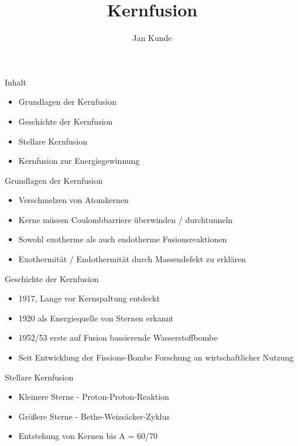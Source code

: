 \documentclass[aspectratio=169,xcolor=dvipsnames,14pt]{beamer}
\title{Kernfusion}
\author{\color{LightGrey}Jan Kunde}
\date{}
\begin{document}
\color{LightGrey}
\begin{frame}{}
\color{LightGrey}
\maketitle
\end{frame}


{
\begin{frame}{Inhalt}
\begin{itemize}
    \color{LightGrey}
\item Grundlagen der Kernfusion
\item Geschichte der Kernfusion
\item Stellare Kernfusion
\item Kernfusion zur Energiegewinnung
\end{itemize}
\end{frame}
}

{
\begin{frame}{Grundlagen der Kernfusion}
\begin{itemize}
    \color{LightGrey}
\item Verschmelzen von Atomkernen
\item Kerne müssen Coulombbarriere überwinden / durchtunneln   
\item Sowohl exotherme als auch endotherme Fusionsreaktionen
\item Exothermität / Endothermität durch Massendefekt zu erklären
\end{itemize}
\end{frame}
}

{
\begin{frame}{Geschichte der Kernfusion}
\begin{itemize}
    \color{LightGrey}
\item 1917, Lange vor Kernspaltung entdeckt
\item 1920 als Energiequelle von Sternen erkannt
\item 1952/53 erste auf Fusion bassierende Wasserstoffbombe
\item Seit Entwicklung der Fissions-Bombe Forschung an wirtschaftlicher Nutzung
\end{itemize}
\end{frame}
}

{
    \begin{frame}{Stellare Kernfusion}
        \begin{itemize}
            \color{LightGrey}
            \item Kleinere Sterne - Proton-Proton-Reaktion
            \item Größere Sterne - Bethe-Weizsäcker-Zyklus
            \item Entstehung von Kernen bis A = 60/70
        \end{itemize}
    \end{frame}
}
\end{document}
